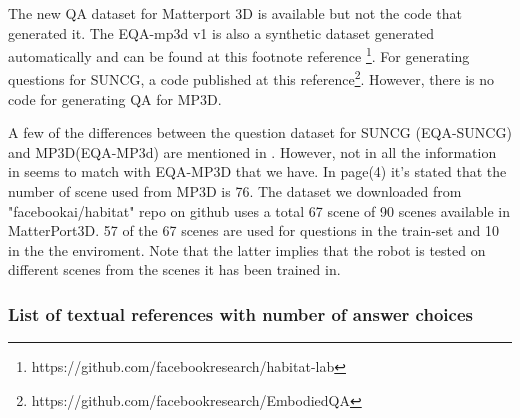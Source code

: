 \documentclass[11pt, a4paper]{article}
\begin{document}
The new QA dataset for Matterport 3D is available but not the code that generated it. The EQA-mp3d v1 is also a synthetic dataset generated automatically and can be found at this footnote reference \footnote{https://github.com/facebookresearch/habitat-lab}. For generating  questions for SUNCG, a code published at this reference\footnote{https://github.com/facebookresearch/EmbodiedQA}. However, there is no code for generating QA for MP3D. 
 
A few of the differences between the question dataset for SUNCG (EQA-SUNCG) and MP3D(EQA-MP3d) are mentioned in \cite{eqa_matterport}. However, not in all the information in  \cite{eqa_matterport} seems to match with EQA-MP3D that we have. In  \cite{eqa_matterport} page(4) it's stated that the number of scene used from MP3D is 76. The dataset we downloaded from "facebookai/habitat" repo on github uses a total 67 scene of 90 scenes available in MatterPort3D. 57 of the 67 scenes are used for questions in the train-set and 10 in the the enviroment. Note that the latter implies that the robot is tested on different scenes from the scenes it has been trained in. 


\subsubsection{List of textual references with number of answer choices}
\end{document}
